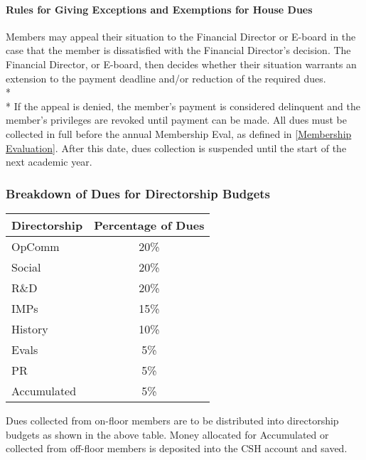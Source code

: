 \documentclass{article}
\newcommand{\asubsection}[1]{\subsubsection{#1} \label{#1}}
\newcommand{\asubsubsection}[1]{\paragraph{#1} \label{#1}}
\begin{document}
\asubsubsection{Rules for Giving Exceptions and Exemptions for House Dues}
Members may appeal their situation to the Financial Director or E-board in the case that the member is dissatisfied with the Financial Director's decision.
The Financial Director, or E-board, then decides whether their situation warrants an extension to the payment deadline and/or reduction of the required dues.
\\*\\*
If the appeal is denied, the member’s payment is considered delinquent and the member’s privileges are revoked until payment can be made.
All dues must be collected in full before the annual Membership Eval, as defined in \ref{Membership Evaluation}.
After this date, dues collection is suspended until the start of the next academic year.
\asubsection{Breakdown of Dues for Directorship Budgets}
\begin{center}
	\begin{tabular}[c]{|l c|}
		\hline
		Directorship & Percentage of Dues
		\\ \hline
		\hline
		OpComm       & 20\%
		\\ \hline
		Social       & 20\%
		\\ \hline
		R\&D         & 20\%
		\\ \hline
		IMPs         & 15\%
		\\ \hline
		History      & 10\%
		\\ \hline
		Evals        & 5\%
		\\ \hline
		PR           & 5\%
		\\ \hline
		Accumulated  & 5\%
		\\ \hline
	\end{tabular}
\end{center}

Dues collected from on-floor members are to be distributed into directorship budgets as shown in the above table.
Money allocated for Accumulated or collected from off-floor members is deposited into the CSH account and saved.
\end{document}
